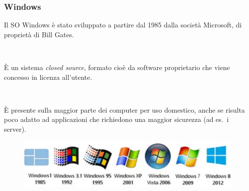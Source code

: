 \documentclass[]{beamer}
\begin{document}
\begin{frame}
\frametitle{Windows}
Il SO Windows è stato sviluppato a partire dal 1985 dalla società Microsoft, di proprietà di Bill Gates.\pause

~

È un sistema \emph{closed source}, formato cioè da \alert<2>{software proprietario} che viene concesso in licenza all'utente.\pause

~

È presente sulla maggior parte dei computer per uso domestico, anche se risulta poco adatto ad applicazioni che richiedono una maggior sicurezza (ad es.~i server).

\begin{figure}
  \includegraphics[width=.8\columnwidth]{img/windows.jpg}
\end{figure}
\end{frame}
\end{document}
